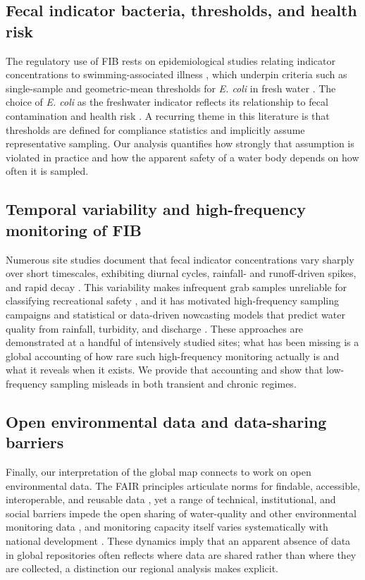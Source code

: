 \documentclass[draft]{agujournal2019}
\begin{document}
\subsection{Fecal indicator bacteria, thresholds, and health risk}
The regulatory use of FIB rests on epidemiological studies relating indicator concentrations to swimming-associated illness \cite{cabelli1982swimmingassociated,prss1998review}, which underpin criteria such as single-sample and geometric-mean thresholds for \textit{E. coli} in fresh water \cite{wade2003environmental,wade2005rapidly,wade2010rapidly,boehm2008sea}. The choice of \textit{E. coli} as the freshwater indicator reflects its relationship to fecal contamination and health risk \cite{edberg2000escherichia,korajkic2018relationships}. A recurring theme in this literature is that thresholds are defined for compliance statistics and implicitly assume representative sampling. Our analysis quantifies how strongly that assumption is violated in practice and how the apparent safety of a water body depends on how often it is sampled.

\subsection{Temporal variability and high-frequency monitoring of FIB}
Numerous site studies document that fecal indicator concentrations vary sharply over short timescales, exhibiting diurnal cycles, rainfall- and runoff-driven spikes, and rapid decay \cite{traister2006variability,meays2006diurnal,desai2013escherichia,nguyen2022fecal}. This variability makes infrequent grab samples unreliable for classifying recreational safety \cite{whitman2004escherichia,kim2004public}, and it has motivated high-frequency sampling campaigns and statistical or data-driven nowcasting models that predict water quality from rainfall, turbidity, and discharge \cite{searcy2023highfrequency,searcy2021day,heasley2021systematic}. These approaches are demonstrated at a handful of intensively studied sites; what has been missing is a global accounting of how rare such high-frequency monitoring actually is and what it reveals when it exists. We provide that accounting and show that low-frequency sampling misleads in both transient and chronic regimes.

\subsection{Open environmental data and data-sharing barriers}
Finally, our interpretation of the global map connects to work on open environmental data. The FAIR principles articulate norms for findable, accessible, interoperable, and reusable data \cite{wilkinson2016fair}, yet a range of technical, institutional, and social barriers impede the open sharing of water-quality and other environmental monitoring data \cite{brasier2017barriers,sugg2021social,hazell2023sociotechnical,heacock2022enhancing}, and monitoring capacity itself varies systematically with national development \cite{kirschke2020capacity,kumpel2020data}. These dynamics imply that an apparent absence of data in global repositories often reflects where data are shared rather than where they are collected, a distinction our regional analysis makes explicit.
\end{document}
